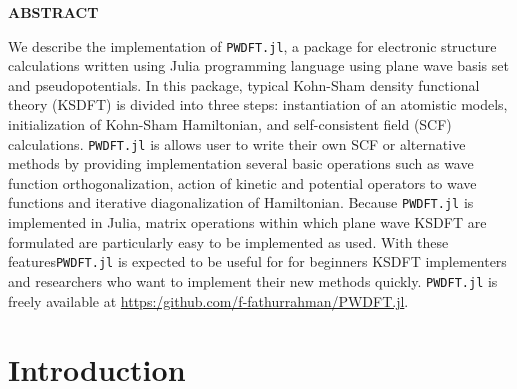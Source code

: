 \documentclass[a0,landscape]{a0poster}
\begin{document}
\begin{multicols}{3}


\color{Navy} %

\begin{minipage}[b]{1.0\linewidth}
\Large

{\centering \textbf{ABSTRACT} \par}

We describe the implementation of \texttt{PWDFT.jl}, a package for electronic
structure calculations written using Julia programming language using
plane wave basis set and pseudopotentials.
In this package, typical Kohn-Sham density functional theory (KSDFT) is divided into three
steps: instantiation of an atomistic models, initialization of Kohn-Sham
Hamiltonian, and self-consistent field (SCF) calculations.
\texttt{PWDFT.jl} is allows user to write their own SCF or alternative methods
by providing implementation several basic operations such as wave function
orthogonalization, action of kinetic and potential operators
to wave functions and iterative diagonalization
of Hamiltonian. Because \texttt{PWDFT.jl} is implemented in Julia, matrix operations
within which plane wave KSDFT are formulated are particularly easy to be implemented
as used.
With these features\texttt{PWDFT.jl} is expected to be useful for for beginners KSDFT
implementers and researchers who want to implement their new methods quickly.
\texttt{PWDFT.jl} is freely available at
\url{https:/github.com/f-fathurrahman/PWDFT.jl}.
\end{minipage}




\color{SaddleBrown} %


\section*{Introduction}


\end{multicols}
\end{document}

